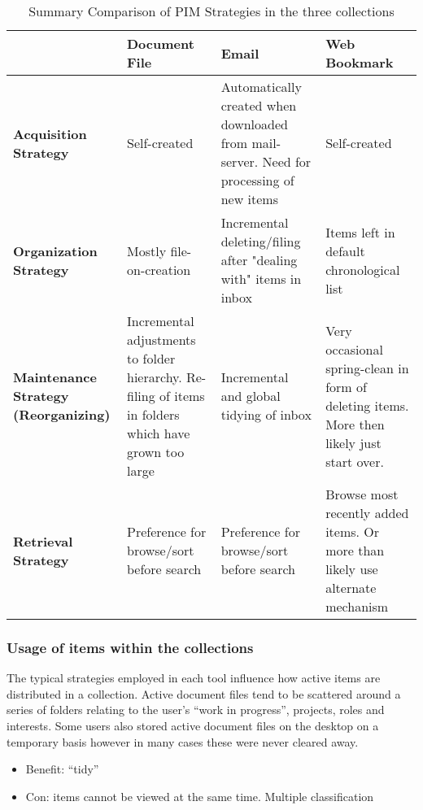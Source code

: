 \begin{table}[h]
\begin{center}
\begin{footnotesize}
\begin{tabular}{|p{2.5cm}|p{3.5cm}|p{3.5cm}|p{3.5cm}|}
\hline
    {\bf } & {\bf Document File} & {\bf Email} & {\bf Web Bookmark} \\
\hline \hline
{\bf Acquisition Strategy} & Self-created & Automatically created when downloaded from mail-server. Need for processing of new items & Self-created \\
\hline
{\bf Organization Strategy} & Mostly file-on-creation & Incremental deleting/filing after "dealing with" items in inbox & Items left in default chronological list \\
\hline
{\bf Maintenance Strategy (Reorganizing) } & Incremental adjustments to folder hierarchy. Re-filing of items in folders which have grown too large & Incremental and global tidying of inbox & Very occasional spring-clean in form of deleting items. More then likely just start over. \\
\hline
{\bf Retrieval Strategy} & Preference for browse/sort before search & Preference for browse/sort before search & Browse most recently added items. Or more than likely use alternate mechanism \\
\hline
\end{tabular}  
\end{footnotesize}
\caption{Summary Comparison of PIM Strategies in the three collections}
\label{table:chapter3_overview_strategy}
\end{center}
\end{table}

\newpage
\subsubsection{Usage of items within the collections}

\noindent
The typical strategies employed in each tool influence how active items are distributed in a collection. Active document files tend to be scattered around a series of folders relating to the user's ``work in progress'', projects, roles and interests.  Some users also stored active document files on the desktop on a temporary basis however in many cases these were never cleared away.
\begin{itemize}
	\item Benefit: ``tidy''
	\item Con: items cannot be viewed at the same time. Multiple classification
\end{itemize}

